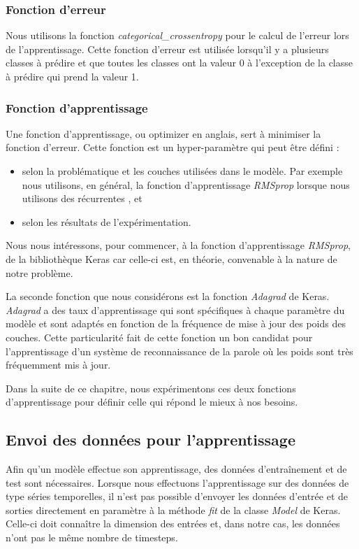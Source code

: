 \subsubsection{Fonction d'erreur}
Nous utilisons la fonction \textit{categorical\_crossentropy} pour le calcul de l'erreur lors de l'apprentissage. Cette fonction d'erreur est utilisée lorsqu'il y a plusieurs classes à prédire et que toutes les classes ont la valeur 0 à l'exception de la classe à prédire qui prend la valeur 1.

\subsubsection{Fonction d'apprentissage}\label{fonctionapp}
Une fonction d'apprentissage, ou optimizer en anglais, sert à minimiser la fonction d'erreur. Cette fonction est un hyper-paramètre qui peut être défini :
\begin{itemize}
    \item selon la problématique et les couches utilisées dans le modèle. Par exemple nous utilisons, en général, la fonction d'apprentissage \textit{RMSprop} lorsque nous utilisons des récurrentes \cite{keras_optimizers}, et
    \item selon les résultats de l'expérimentation. \\
\end{itemize}

Nous nous intéressons, pour commencer, à la fonction d'apprentissage \textit{RMSprop}, de la bibliothèque Keras \cite{keras_optimizers} car celle-ci est, en théorie, convenable à la nature de notre problème.

La seconde fonction que nous considérons est la fonction \textit{Adagrad} de Keras. \textit{Adagrad} a des taux d’apprentissage qui sont spécifiques à chaque paramètre du modèle et sont adaptés en fonction de la fréquence de mise à jour des poids des couches. Cette particularité fait de cette fonction un bon candidat pour l'apprentissage d'un système de reconnaissance de la parole où les poids sont très fréquemment mis à jour. 

Dans la suite de ce chapitre, nous expérimentons ces deux fonctions d'apprentissage pour définir celle qui répond le mieux à nos besoins. 

\subsection{Envoi des données pour l'apprentissage}
Afin qu'un modèle effectue son apprentissage, des données d'entraînement et de test sont nécessaires. Lorsque nous effectuons l'apprentissage sur des données de type séries temporelles, il n'est pas possible d'envoyer les données d'entrée et de sorties directement en paramètre à la méthode \textit{fit} de la classe \textit{Model} de Keras. Celle-ci doit connaître la dimension des entrées et, dans notre cas, les données n'ont pas le même nombre de timesteps.

